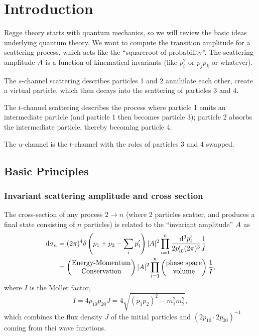 \chapter{Introduction}


\M
Regge theory starts with quantum mechanics, so we will review the basic
ideas underlying quantum theory. We want to compute the transition
amplitude for a scattering process, which acts like the ``squareroot of
probability''. The scattering amplitude $A$ is a function of
kinematical invariants (like $p_{i}^{2}$ or $p_{j}p_{k}$ or whatever).

The $s$-channel scattering describes particles 1 and 2 annihilate each
other, create a virtual particle, which then decays into the scattering
of particles 3 and 4.

The $t$-channel scattering describes the process where particle 1 emits
an intermediate particle (and particle 1 then becomes particle 3);
particle 2 absorbs the intermediate particle, thereby becoming particle
4.

The $u$-channel is the $t$-channel with the roles of particles 3 and 4
swapped.
\section{Basic Principles}

\subsection{Invariant scattering amplitude and cross section}
\M
The cross-section of any process $2\to n$ (where 2 particles scatter,
and produces a final state consisting of $n$ particles) is related to
the ``invariant amplitude'' $A$ as
\begin{equation}
  \begin{split}
\mathrm{d}\sigma_{n} &= (2\pi)^{4}\delta\left(p_{1}+p_{2}-\sum_{i}p_{i}'\right)|A|^{2}
\prod^{n}_{i=1}\frac{\mathrm{d}^{3}p'_{i}}{2p'_{i0}(2\pi)^{3}}\frac{1}{I}\\
&=\begin{pmatrix}\mbox{Energy-Momentum}\\
\mbox{Conservation}
\end{pmatrix}|A|^{2}\prod^{n}_{i=1}\begin{pmatrix}\mbox{phase space}\\
\mbox{volume}
\end{pmatrix}\frac{1}{I},
  \end{split}
  \end{equation}
where $I$ is the Moller factor,
\begin{equation}
I = 4p_{10}p_{20}J = 4\sqrt{(p_{1}p_{2})^{2} - m_{1}^{2}m_{2}^{2}},
\end{equation}
which combines the flux density $J$ of the initial particles and
$(2p_{10}\cdot2p_{20})^{-1}$ coming from thei wave functions.

